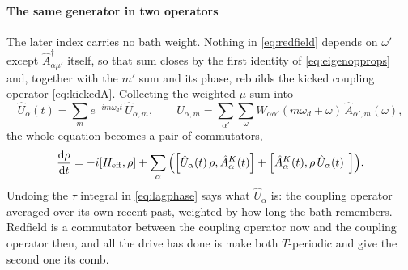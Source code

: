 \documentclass[a4paper,11pt]{article}
\newcommand{\eff}{\mathrm{eff}}
\begin{document}
\paragraph{The same generator in two operators}
The later index carries no bath weight. Nothing in \eqref{eq:redfield} depends on $\omega'$ except $\hat A^\dagger_{\alpha\mu'}$ itself, so that sum closes by the first identity of \eqref{eq:eigenopprops} and, together with the $m'$ sum and its phase, rebuilds the kicked coupling operator \eqref{eq:kickedA}. Collecting the weighted $\mu$ sum into
\begin{equation}\label{eq:weightedA}
  \hat U_\alpha(t) = \sum_m e^{-im\omega_d t}\,\hat U_{\alpha,m},
  \qquad
  \hat U_{\alpha,m} = \sum_{\alpha'}\sum_\omega
    W_{\alpha\alpha'}(m\omega_d + \omega)\,\hat A_{\alpha',m}(\omega),
\end{equation}
the whole equation becomes a pair of commutators,
\begin{equation}\label{eq:redfield-compact}
  \dv{\rho}{t} = -i\comm{H_\eff}{\rho}
  + \sum_\alpha\Big(\comm{\hat U_\alpha(t)\,\rho}{\hat A^K_\alpha(t)}
  + \comm{\hat A^K_\alpha(t)}{\rho\,\hat U_\alpha(t)^\dagger}\Big).
\end{equation}
Undoing the $\tau$ integral in \eqref{eq:lagphase} says what $\hat U_\alpha$ is: the coupling operator averaged over its own recent past, weighted by how long the bath remembers. Redfield is a commutator between the coupling operator now and the coupling operator then, and all the drive has done is make both $T$-periodic and give the second one its comb.
\end{document}

